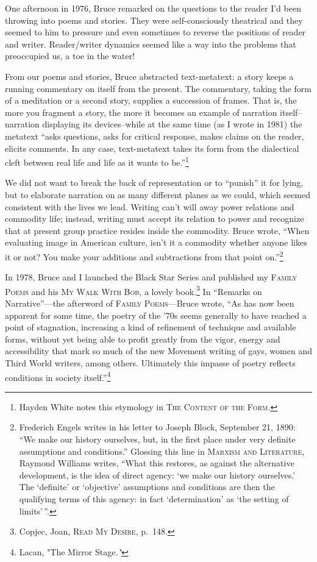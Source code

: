 \documentclass[
]{memoir}
\begin{document}
One afternoon in 1976, Bruce remarked on the questions to the reader I'd
been throwing into poems and stories. They were self-consciously
theatrical and they seemed to him to pressure and even sometimes to
reverse the positions of reader and writer. Reader/writer dynamics
seemed like a way into the problems that preoccupied us, a toe in the
water!

From our poems and stories, Bruce abstracted text-metatext: a story
keeps a running commentary on itself from the present. The commentary,
taking the form of a meditation or a second story, supplies a succession
of frames. That is, the more you fragment a story, the more it becomes
an example of narration itself--narration displaying its devices--while
at the same time (as I wrote in 1981) the metatext ``asks questions,
asks for critical response, makes claims on the reader, elicits
comments. In any case, text-metatext takes its form from the dialectical
cleft between real life and life as it wants to be.''\footnote{Hayden
  White notes this etymology in \textsc{The Content of the Form}\emph{.}}

We did not want to break the back of representation or to ``punish'' it
for lying, but to elaborate narration on as many different planes as we
could, which seemed consistent with the lives we lead. Writing can't
will away power relations and commodity life; instead, writing must
accept its relation to power and recognize that at present group
practice resides inside the commodity. Bruce wrote, ``When evaluating
image in American culture, isn't it a commodity whether anyone likes it
or not? You make your additions and subtractions from that point
on.''\footnote{Frederich Engels writes in his letter to Joseph Block,
  September 21, 1890: ``We make our history ourselves, but, in the first
  place under very definite assumptions and conditions.'' Glossing this
  line in \textsc{Marxism and Literature}, Raymond Williams writes,
  ``What this restores, as against the alternative development, is the
  idea of direct agency: `we make our history ourselves.' The `definite'
  or `objective' assumptions and conditions are then the qualifying
  terms of this agency: in fact `determination' as `the setting of
  limits'\,''.}

In 1978, Bruce and I launched the Black Star Series and published my
\textsc{Family Poems} and his \textsc{My Walk With Bob}, a lovely
book.\footnote{Copjec, Joan, \textsc{Read My Desire}, p.~148.} In
``Remarks on Narrative''---the afterword of \textsc{Family
Poems}---Bruce wrote, ``As has now been apparent for some time, the
poetry of the '70s seems generally to have reached a point of
stagnation, increasing a kind of refinement of technique and available
forms, without yet being able to profit greatly from the vigor, energy
and accessibility that mark so much of the new Movement writing of gays,
women and Third World writers, among others. Ultimately this impasse of
poetry reflects conditions in society itself.''\footnote{Lacan, "The
  Mirror Stage.\emph{"}}
\end{document}
